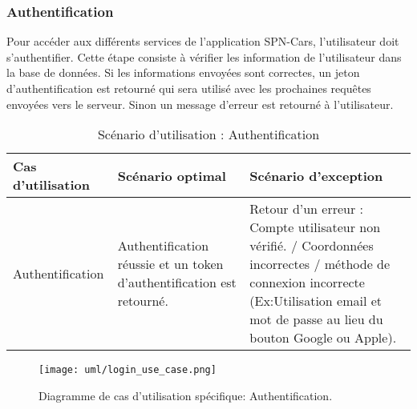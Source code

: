 \subsubsection{Authentification}
Pour accéder aux différents services de l'application SPN-Cars, l'utilisateur doit s'authentifier. Cette étape consiste à vérifier les information de l'utilisateur dans la base de données. Si les informations envoyées sont correctes, un jeton d'authentification est retourné qui sera utilisé avec les prochaines requêtes envoyées vers le serveur. Sinon un message d'erreur est retourné à l'utilisateur.
\begin{table}[H]
    \begin{center}
        \begin{tabularx}{\textwidth} {
                | >{\centering\arraybackslash}X
                | >{\centering\arraybackslash}X
                | >{\centering\arraybackslash}X |}
            \hline
            Cas d'utilisation & Scénario optimal                                                      & Scénario d'exception                                                                                                                                                                       \\
            \hline
            Authentification  & Authentification réussie et un token d'authentification est retourné. & Retour d'un erreur : Compte utilisateur non vérifié. / Coordonnées incorrectes / méthode de connexion incorrecte (Ex:Utilisation email et mot de passe au lieu du bouton Google ou Apple). \\
            \hline
        \end{tabularx}
        \captionsetup{justification=centering}
        \caption{Scénario d'utilisation : Authentification}
        \label{tab:login_scenario}
    \end{center}
\end{table}
\vspace{1cm}
\begin{figure}[H]
    \centering
    \texttt{[image: uml/login\_use\_case.png]}
    \vspace{1cm}
    \captionsetup{justification=centering}
    \caption{Diagramme de cas d'utilisation spécifique: Authentification.}
    \label{fig:use_case_login}
\end{figure}
